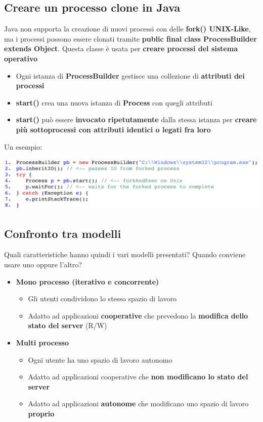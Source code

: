 \documentclass[12pt]{article}
\begin{document}
\subsection{Creare un processo clone in Java}
Java non supporta la creazione di nuovi processi con delle \textbf{fork() UNIX-Like}, ma i processi possono essere clonati tramite \textbf{public final class ProcessBuilder extends Object}. Questa classe è usata per \textbf{creare processi del sistema operativo}
\begin{itemize}
    \item Ogni istanza di \textbf{ProcessBuilder} gestisce una collezione di \textbf{attributi dei processi}
    \item \textbf{start()} crea una nuova istanza di \textbf{Process} con quegli attributi
    \item \textbf{start()} può essere \textbf{invocato ripetutamente} dalla stessa istanza per \textbf{creare più sottoprocessi con attributi identici o legati fra loro}
\end{itemize}
Un esempio:
\begin{center}
    \includegraphics[width = 1\textwidth]{Images/44.PNG}
\end{center}
\subsection{Confronto tra modelli}
Quali caratteristiche hanno quindi i vari modelli presentati? Quando conviene usare uno oppure l'altro?
\begin{itemize}
    \item \textbf{Mono processo (iterativo e concorrente)}
          \begin{itemize}
              \item Gli utenti condividono lo stesso spazio di lavoro
              \item Adatto ad applicazioni \textbf{cooperative} che prevedono la \textbf{modifica dello stato del server} (R/W)
          \end{itemize}
    \item \textbf{Multi processo}
          \begin{itemize}
              \item Ogni utente ha uno spazio di lavoro autonomo
              \item Adatto ad applicazioni cooperative che \textbf{non modificano lo stato del server}
              \item Adatto ad applicazioni \textbf{autonome} che modificano uno spazio di lavoro \textbf{proprio}
          \end{itemize}
\end{itemize}
\end{document}
